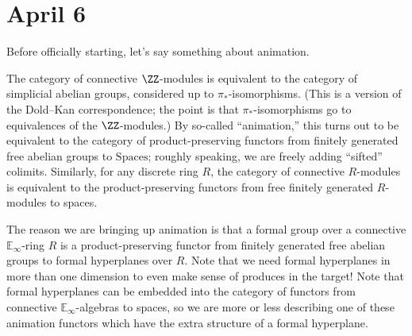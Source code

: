 \documentclass[../notes.tex]{subfiles}
\begin{document}
\section{April 6}
Before officially starting, let's say something about animation.
\begin{remark}[animation]
	The category of connective $\ZZ$-modules is equivalent to the category of simplicial abelian groups, considered up to $\pi_*$-isomorphisms. (This is a version of the Dold--Kan correspondence; the point is that $\pi_*$-isomorphisms go to equivalences of the $\ZZ$-modules.) By so-called ``animation,'' this turns out to be equivalent to the category of product-preserving functors from finitely generated free abelian groups to $\mathrm{Spaces}$; roughly speaking, we are freely adding ``sifted'' colimits. Similarly, for any discrete ring $R$, the category of connective $R$-modules is equivalent to the product-preserving functors from free finitely generated $R$-modules to spaces.
\end{remark}
The reason we are bringing up animation is that a formal group over a connective $\mathbb E_\infty$-ring $R$ is a product-preserving functor from finitely generated free abelian groups to formal hyperplanes over $R$. Note that we need formal hyperplanes in more than one dimension to even make sense of produces in the target! Note that formal hyperplanes can be embedded into the category of functors from connective $\mathbb E_\infty$-algebras to spaces, so we are more or less describing one of these animation functors which have the extra structure of a formal hyperplane.
\end{document}
